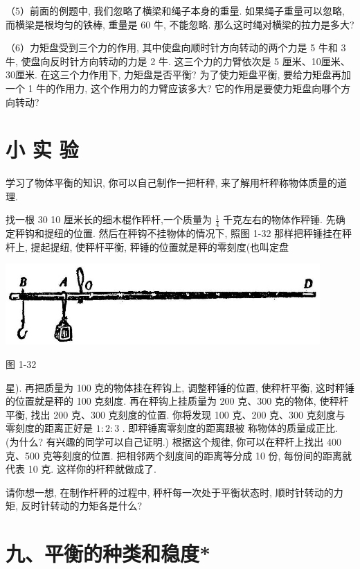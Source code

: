 \documentclass[10pt]{article}
\begin{document}
（5）前面的例题中, 我们忽略了横梁和绳子本身的重量. 如果绳子重量可以忽略, 而横梁是根均匀的铁棒, 重量是 60 牛, 不能忽略. 那么这时绳对横梁的拉力是多大?

（6）力矩盘受到三个力的作用, 其中使盘向顺时针方向转动的两个力是 5 牛和 3 牛, 使盘向反时针方向转动的力是 2 牛. 这三个力的力臂依次是 5 厘米、10厘米、30厘米. 在这三个力作用下, 力矩盘是否平衡? 为了使力矩盘平衡, 要给力矩盘再加一个 1 牛的作用力, 这个作用力的力臂应该多大? 它的作用是要使力矩盘向哪个方向转动?

\section*{小 实 验}

学习了物体平衡的知识, 你可以自己制作一把杆秤, 来了解用杆秤称物体质量的道理.

找一根 30 10 厘米长的细木棍作秤杆,一个质量为 \(\frac{1}{4}\) 千克左右的物体作秤锤. 先确定秤钩和提纽的位置. 然后在秤钩不挂物体的情况下, 照图 1-32 那样把秤锤挂在秤杆上, 提起提纽, 使秤杆平衡, 秤锤的位置就是秤的零刻度(也叫定盘

\begin{center}
\includegraphics[max width=0.9\textwidth]{images/01912d55-147c-70aa-b0e0-1782a122f948_45_871328.jpg}
\end{center}

图 1-32

星). 再把质量为 100 克的物体挂在秤钩上, 调整秤锤的位置, 使秤杆平衡, 这时秤锤的位置就是秤的 100 克刻度. 再在秤钩上挂质量为 200 克、300 克的物体, 使秤杆平衡, 找出 200 克、300 克刻度的位置. 你将发现 100 克、200 克、300 克刻度与零刻度的距离正好是 \(1 : 2 : 3\) . 即秤锤离零刻度的距离跟被 称物体的质量成正比. (为什么? 有兴趣的同学可以自己证明.) 根据这个规律, 你可以在秤杆上找出 400 克、500 克等刻度的位置. 把相邻两个刻度间的距离等分成 10 份, 每份间的距离就代表 10 克. 这样你的杆秤就做成了.

请你想一想, 在制作杆秤的过程中, 秤杆每一次处于平衡状态时, 顺时针转动的力矩, 反时针转动的力矩各是什么?

\section*{九、平衡的种类和稳度*}
\end{document}
